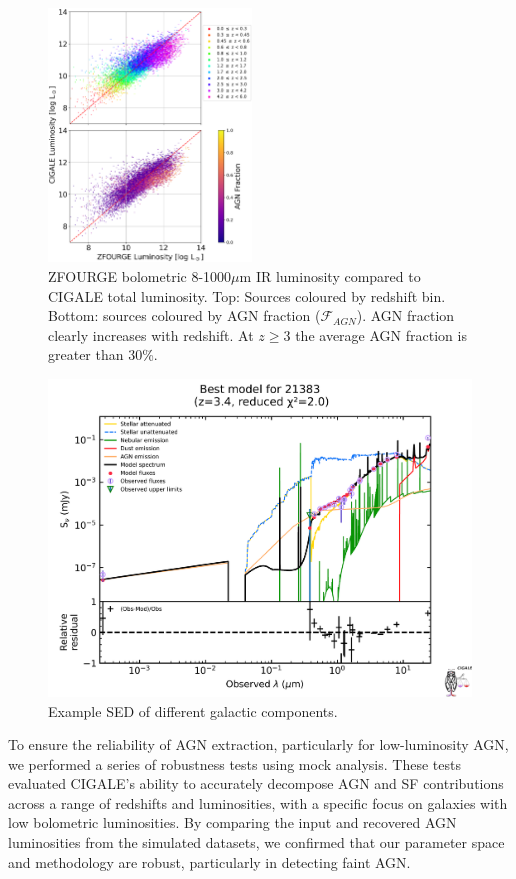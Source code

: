 \begin{figure}
    \centering
    \includegraphics[width=0.48\textwidth]{Figures/LIR vs LIR.png}
    \caption{ZFOURGE bolometric 8-1000$\mu$m IR luminosity compared to CIGALE total luminosity. Top: Sources coloured by redshift bin. Bottom: sources coloured by AGN fraction ($\mathcal{F}_{AGN}$). AGN fraction clearly increases with redshift. At $z \geq 3$ the average AGN fraction is greater than 30\%.}
    \label{Fig: LIR vs LIR}
\end{figure}

\begin{figure}
    \centering
    \includegraphics[width=\textwidth]{Figures/SED Example.png}
    \caption{Example SED of different galactic components.}
    \label{Fig: SED Example}
\end{figure}

To ensure the reliability of AGN extraction, particularly for low-luminosity AGN, we performed a series of robustness tests using mock analysis. These tests evaluated CIGALE's ability to accurately decompose AGN and SF contributions across a range of redshifts and luminosities, with a specific focus on galaxies with low bolometric luminosities. By comparing the input and recovered AGN luminosities from the simulated datasets, we confirmed that our parameter space and methodology are robust, particularly in detecting faint AGN.

